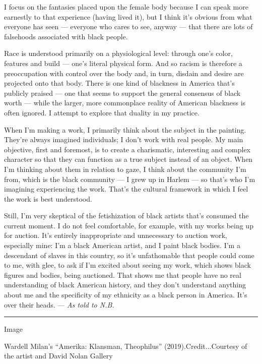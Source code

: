 I focus on the fantasies placed upon the female body because I can speak
more earnestly to that experience (having lived it), but I think it's
obvious from what everyone has seen --- everyone who cares to see,
anyway --- that there are lots of falsehoods associated with black
people.

Race is understood primarily on a physiological level: through one's
color, features and build --- one's literal physical form. And so racism
is therefore a preoccupation with control over the body and, in turn,
disdain and desire are projected onto that body. There is one kind of
blackness in America that's publicly praised --- one that seems to
support the general consensus of black worth --- while the larger, more
commonplace reality of American blackness is often ignored. I attempt to
explore that duality in my practice.

When I'm making a work, I primarily think about the subject in the
painting. They're always imagined individuals; I don't work with real
people. My main objective, first and foremost, is to create a
charismatic, interesting and complex character so that they can function
as a true subject instead of an object. When I'm thinking about them in
relation to gaze, I think about the community I'm from, which is the
black community --- I grew up in Harlem --- so that's who I'm imagining
experiencing the work. That's the cultural framework in which I feel the
work is best understood.

Still, I'm very skeptical of the fetishization of black artists that's
consumed the current moment. I do not feel comfortable, for example,
with my works being up for auction. It's entirely inappropriate and
unnecessary to auction work, especially mine: I'm a black American
artist, and I paint black bodies. I'm a descendant of slaves in this
country, so it's unfathomable that people could come to me, with glee,
to ask if I'm excited about seeing my work, which shows black figures
and bodies, being auctioned. That shows me that people have no real
understanding of black American history, and they don't understand
anything about me and the specificity of my ethnicity as a black person
in America. It's over their heads. --- \emph{As told to N.B.}

\begin{center}\rule{0.5\linewidth}{\linethickness}\end{center}

Image

Wardell Milan's ``Amerika: Klansman, Theophilus''
(2019).Credit...Courtesy of the artist and David Nolan Gallery

